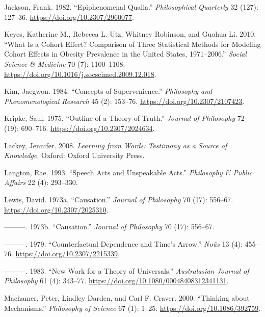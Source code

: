 \documentclass[
  12pt,
  letterpaper,
  DIV=11,
  numbers=noendperiod]{scrartcl}
\newlength{\cslhangindent}
\newenvironment{CSLReferences}[2] %
 {\begin{list}{}{%
  \setlength{\itemindent}{0pt}
  \setlength{\leftmargin}{0pt}
  \setlength{\parsep}{0pt}
  \ifodd #1
   \setlength{\leftmargin}{\cslhangindent}
   \setlength{\itemindent}{-1\cslhangindent}
  \fi
  \setlength{\itemsep}{#2\baselineskip}}}
 {\end{list}}
\begin{document}
\begin{CSLReferences}{1}{0}
Jackson, Frank. 1982. {``Epiphenomenal Qualia.''} \emph{Philosophical
Quarterly} 32 (127): 127--36. \url{https://doi.org/10.2307/2960077}.

Keyes, Katherine M., Rebecca L. Utz, Whitney Robinson, and Guohua Li.
2010. {``What Is a Cohort Effect? Comparison of Three Statistical
Methods for Modeling Cohort Effects in Obesity Prevalence in the United
States, 1971--2006.''} \emph{Social Science \& Medicine} 70 (7):
1100--1108. \url{https://doi.org/10.1016/j.socscimed.2009.12.018}.

Kim, Jaegwon. 1984. {``Concepts of Supervenience.''} \emph{Philosophy
and Phenomenological Research} 45 (2): 153--76.
\url{https://doi.org/10.2307/2107423}.

Kripke, Saul. 1975. {``Outline of a Theory of Truth.''} \emph{Journal of
Philosophy} 72 (19): 690--716. \url{https://doi.org/10.2307/2024634}.

Lackey, Jennifer. 2008. \emph{Learning from Words: Testimony as a Source
of Knowledge}. Oxford: Oxford University Press.

Langton, Rae. 1993. {``Speech Acts and Unspeakable Acts.''}
\emph{Philosophy \& Public Affairs} 22 (4): 293--330.

Lewis, David. 1973a. {``Causation.''} \emph{Journal of Philosophy} 70
(17): 556--67. \url{https://doi.org/10.2307/2025310}.

---------. 1973b. {``Causation.''} \emph{Journal of Philosophy} 70 (17):
556--67.

---------. 1979. {``Counterfactual Dependence and Time's Arrow.''}
\emph{Noûs} 13 (4): 455--76. \url{https://doi.org/10.2307/2215339}.

---------. 1983. {``New Work for a Theory of Universals.''}
\emph{Australasian Journal of Philosophy} 61 (4): 343--77.
\url{https://doi.org/10.1080/00048408312341131}.

Machamer, Peter, Lindley Darden, and Carl F. Craver. 2000. {``Thinking
about Mechanisms.''} \emph{Philosophy of Science} 67 (1): 1--25.
\url{https://doi.org/10.1086/392759}.


\end{CSLReferences}
\end{document}
